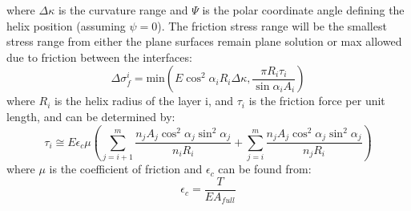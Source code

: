 where $\Delta \kappa$ is the curvature range and $\Psi$ is the polar coordinate angle defining the helix position (assuming $\psi=0$). \newline
\newline
The friction stress range will be the smallest stress range from either the plane surfaces remain plane solution or max allowed due to friction between the interfaces:
\begin{equation}
    \Delta \sigma_f^i =\text{min}\left(E \cos^2 \alpha_i R_i \Delta \kappa , \frac{\pi R_i \tau_i}{\sin \alpha_i A_i}\right)
\end{equation}
where $R_i$ is the helix radius of the layer i, and $\tau_i$ is the friction force per unit length, and can be determined by:
\begin{equation}
    \tau_i \cong E \epsilon_c \mu \left( \sum_{j=i+1}^m \frac{n_j A_j \cos^2 \alpha_j \sin^2 \alpha_j }{n_i R_i} + \sum_{j=i}^m \frac{n_j A_j \cos^2 \alpha_j  \sin^2 \alpha_j}{n_j R_i}\right)
\end{equation}
where $\mu$ is the coefficient of friction and $\epsilon_c$ can be found from:
\begin{equation}
    \epsilon_c =\frac{T}{EA_{full}}
    \label{eq:stressvariation2}
\end{equation}